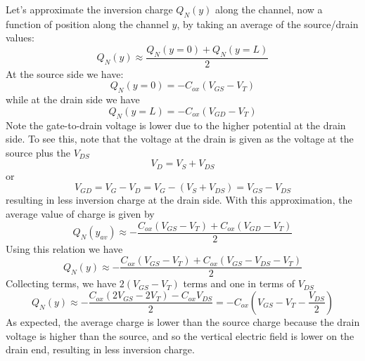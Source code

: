 Let's approximate the inversion charge $Q_N(y)$ along the channel, now a function of position along the channel $y$, by taking an average of the source/drain values:
    \begin{equation} 
        {Q_N}(y) \approx \frac{{Q_N}(y = 0) + {Q_N}(y = L)}{2} 
    \end{equation}
At the source side we have:
    \begin{equation} 
        {Q_N}(y = 0) =  - {C_{ox}}({V_{GS}} - {V_T}) 
    \end{equation}
while at the drain side we have
    \begin{equation} 
        {Q_N}(y = L) =  - {C_{ox}}({V_{GD}} - {V_T}) 
    \end{equation}
Note the gate-to-drain voltage is lower due to the higher potential at the drain side.  To see this, note that 
the voltage at the drain is given as the voltage at the source plus the $V_{DS}$
    \[
    	V_D = V_S + V_{DS}
    \]
    or
    \[
    	V_{GD} = V_{G} - V_{D} = V_{G} - (V_S + V_{DS}) = V_{GS} - V_{DS} 
    \]
resulting in less inversion charge at the drain side.  With this approximation, the average value of charge is given by
    \begin{equation}
        {Q_N}(y_{av}) \approx  - \frac{{{C_{ox}}({V_{GS}} - {V_T}) + {C_{ox}}({V_{GD}} - {V_T})}}{2}
    \end{equation}
Using this relation we have
    \begin{equation}
        {Q_N}(y) \approx  - \frac{{{C_{ox}}({V_{GS}} - {V_T}) + {C_{ox}}({V_{GS}} - {V_{DS}} - {V_T})}}{2}
    \end{equation}
Collecting terms, we have $2(V_{GS} - V_T)$ terms and one in terms of $V_{DS}$
    \begin{equation}
        {Q_N}(y) \approx  - \frac{{{C_{ox}}(2{V_{GS}} - 2{V_T}) - {C_{ox}}{V_{DS}}}}{2} =  - {C_{ox}}({V_{GS}} - {V_T} - \frac{{{V_{DS}}}}{2})
    \end{equation}
As expected, the average charge is lower than the source charge because the drain voltage is higher than the source, and so the vertical electric field is lower on the drain end, resulting in less inversion charge.
